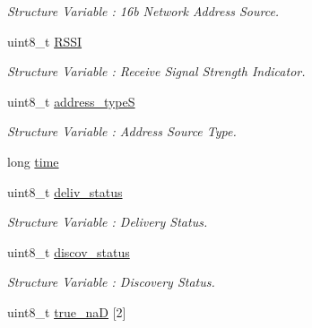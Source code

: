 \begin{DoxyCompactItemize}
\begin{DoxyCompactList}\small\item\em Structure Variable \+: 16b Network Address Source. \end{DoxyCompactList}\item 
uint8\+\_\+t \hyperlink{structpacket_x_bee_a2165bdf3528a660454d2f422710818b3}{R\+S\+SI}\hypertarget{structpacket_x_bee_a2165bdf3528a660454d2f422710818b3}{}\label{structpacket_x_bee_a2165bdf3528a660454d2f422710818b3}

\begin{DoxyCompactList}\small\item\em Structure Variable \+: Receive Signal Strength Indicator. \end{DoxyCompactList}\item 
uint8\+\_\+t \hyperlink{structpacket_x_bee_a8d484ac1477b21e6b901802ea3516a3a}{address\+\_\+typeS}
\begin{DoxyCompactList}\small\item\em Structure Variable \+: Address Source Type. \end{DoxyCompactList}\item 
long \hyperlink{structpacket_x_bee_a5223f89f7bc1787d2546c850363777d1}{time}
\item 
uint8\+\_\+t \hyperlink{structpacket_x_bee_a9f97b9eca00a4aeca9d3946fb94cc658}{deliv\+\_\+status}\hypertarget{structpacket_x_bee_a9f97b9eca00a4aeca9d3946fb94cc658}{}\label{structpacket_x_bee_a9f97b9eca00a4aeca9d3946fb94cc658}

\begin{DoxyCompactList}\small\item\em Structure Variable \+: Delivery Status. \end{DoxyCompactList}\item 
uint8\+\_\+t \hyperlink{structpacket_x_bee_ad9cb90269757bb045e8fc3494f1262a2}{discov\+\_\+status}\hypertarget{structpacket_x_bee_ad9cb90269757bb045e8fc3494f1262a2}{}\label{structpacket_x_bee_ad9cb90269757bb045e8fc3494f1262a2}

\begin{DoxyCompactList}\small\item\em Structure Variable \+: Discovery Status. \end{DoxyCompactList}\item 
uint8\+\_\+t \hyperlink{structpacket_x_bee_aa41e990f8aac86b564793a0957cb3700}{true\+\_\+naD} \mbox{[}2\mbox{]}\hypertarget{structpacket_x_bee_aa41e990f8aac86b564793a0957cb3700}{}\label{structpacket_x_bee_aa41e990f8aac86b564793a0957cb3700}


\end{DoxyCompactItemize}
